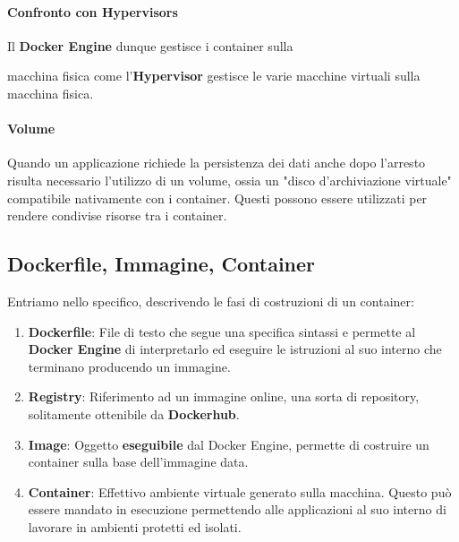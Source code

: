 \documentclass{article}
\begin{document}
\vspace*{15px}


\paragraph{Confronto con Hypervisors} Il \textbf{Docker Engine} dunque gestisce i container sulla 

macchina fisica come l'\textbf{Hypervisor} gestisce le varie macchine virtuali sulla macchina fisica.

\vspace*{15px}

\paragraph{Volume} Quando un applicazione richiede la persistenza dei dati anche dopo l'arresto risulta necessario l'utilizzo di un volume, ossia un "disco d'archiviazione virtuale" compatibile nativamente con i container. Questi possono essere utilizzati per rendere condivise risorse tra i container.

\newpage

\subsection{Dockerfile, Immagine, Container}

Entriamo nello specifico, descrivendo le fasi di costruzioni di un container:

\begin{enumerate}
    \item \textbf{Dockerfile}: File di testo che segue una specifica sintassi e permette al \textbf{Docker Engine} di interpretarlo ed eseguire le istruzioni al suo interno che terminano producendo un immagine.
    \item \textbf{Registry}: Riferimento ad un immagine online, una sorta di repository, solitamente ottenibile da \textbf{Dockerhub}.
    \item \textbf{Image}: Oggetto \textbf{eseguibile} dal Docker Engine, permette di costruire un container sulla base dell'immagine data.
    \item \textbf{Container}: Effettivo ambiente virtuale generato sulla macchina. Questo può essere mandato in esecuzione permettendo alle applicazioni al suo interno di lavorare in ambienti protetti ed isolati.
\end{enumerate}
\end{document}
